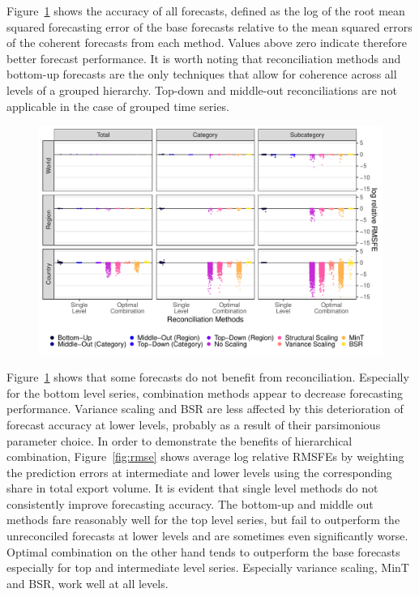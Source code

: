 \documentclass[a4paper,fleqn,11pt]{article}
\begin{document}
Figure~\ref{fig:rmse_all} shows the accuracy of all forecasts, defined as the log of the root mean squared forecasting error of the base forecasts relative to the mean squared errors of the coherent forecasts from each method. Values above zero indicate therefore better forecast performance. It is worth noting that reconciliation methods and bottom-up forecasts are the only techniques that allow for coherence across all levels of a grouped hierarchy. Top-down and middle-out reconciliations are not applicable in the case of grouped time series.

\begin{figure}[H]
	\includegraphics[width=\textwidth]{fig/fig_rmsfe_dots}
	\label{fig:rmse_all}
\end{figure}

Figure~\ref{fig:rmse_all} shows that some forecasts do not benefit from reconciliation. Especially for the bottom level series, combination methods appear to decrease forecasting performance. Variance scaling and BSR are less affected by this deterioration of forecast accuracy at lower levels, probably as a result of their parsimonious parameter choice. In order to demonstrate the benefits of hierarchical combination, Figure~\ref{fig:rmse} shows average log relative RMSFEs by weighting the prediction errors at intermediate and lower levels using the corresponding share in total export volume. It is evident that single level methods do not consistently improve forecasting accuracy. The bottom-up and middle out methods fare reasonably well for the top level series, but fail to outperform the unreconciled forecasts at lower levels and are sometimes even significantly worse. Optimal combination on the other hand tends to outperform the base forecasts especially for top and intermediate level series. Especially variance scaling, MinT and BSR, work well at all levels.
\end{document}
